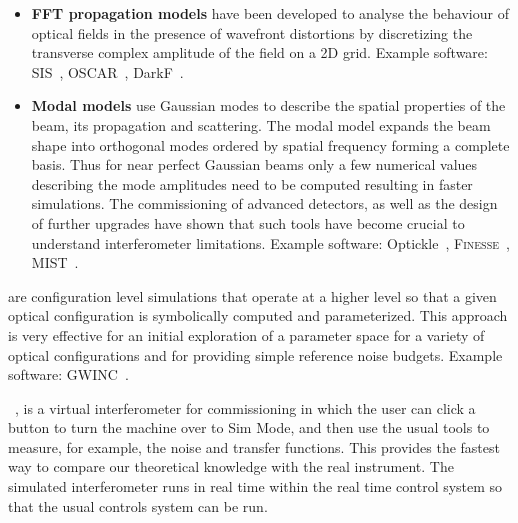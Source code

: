\begin{itemize}
\item{\textbf{FFT propagation models}} have been developed to analyse the behaviour of optical fields in the presence of wavefront distortions by discretizing the transverse complex amplitude of the field on a 2D grid.
Example software: SIS~\cite{SIS}, OSCAR~\cite{OSCAR}, DarkF~\cite{DarkF, Vinet92}.
 
\item{\textbf{Modal models}} use Gaussian modes to describe the spatial properties of the beam, its propagation and scattering. The modal model expands the beam shape into orthogonal modes ordered by spatial frequency forming a complete basis. Thus for near perfect Gaussian beams only a few numerical values describing the mode amplitudes need to be computed resulting in faster simulations. The commissioning of advanced detectors, as well as the design of further upgrades have shown that such tools have become crucial to understand interferometer limitations. 
Example software: Optickle~\cite{Optickle}, \textsc{Finesse}~\cite{Finesse, Freise04}, MIST~\cite{MIST}.
\end{itemize}
 are configuration level simulations that operate at a higher level so that a given optical configuration is symbolically computed and parameterized. 
This approach is very effective for an initial exploration of a parameter space for a variety of optical configurations and for providing simple reference noise budgets. Example software: GWINC~\cite{GWINC}.

~\cite{simplant}, is a virtual interferometer for commissioning in which the user can click a button to turn the machine over to Sim Mode, and then use the usual tools to measure, for example, the noise and transfer functions. This provides the fastest way to compare our theoretical knowledge with the real instrument.
The simulated interferometer runs in real time within the real time control system so that the usual controls system can be run. 

